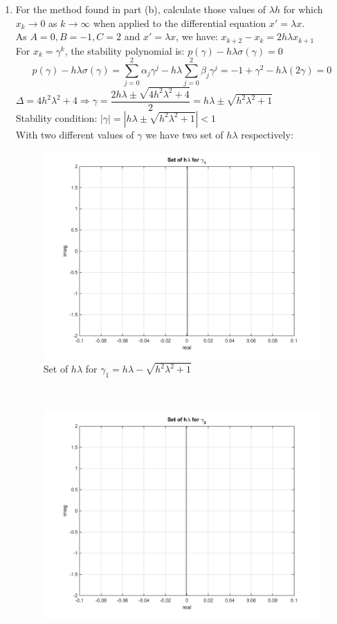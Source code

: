\documentclass[14pt,a4paper]{article}
\begin{document}
\begin{enumerate}
	\label{2e} 
	\item For the method found in part (b), calculate those values of $\lambda h$ for which $x_k \rightarrow 0$ as $k \rightarrow \infty$ when applied to the differential equation $x' = \lambda x$.\\
	As $A = 0, B = -1, C= 2$ and $x' = \lambda x$, we have: $x_{k+2} - x_k = 2h\lambda x_{k+1}$\\
	For $x_k = \gamma^k$, the stability polynomial is: $p(\gamma) - h\lambda\sigma(\gamma) = 0$
	$$p(\gamma) - h\lambda\sigma(\gamma) = \sum_{j=0}^{2}\alpha_j\gamma^j - h\lambda\sum_{j=0}^{2}\beta_j\gamma^j = -1 + \gamma^2 - h\lambda(2\gamma) = 0$$
	$\Delta = 4h^2\lambda^2 + 4 \Rightarrow \gamma = \dfrac{2h\lambda \pm \sqrt{4h^2\lambda^2 + 4}}{2} = h\lambda \pm \sqrt{h^2\lambda^2 +1}$\\
	Stability condition: $|\gamma| = |h\lambda \pm \sqrt{h^2\lambda^2 +1}| <1$\\
	With two different values of $\gamma$ we have two set of $h\lambda$ respectively: 
	\begin{figure}[htp]
		\centering
		\includegraphics[scale=0.5]{hw6_2e1.png}
		\caption{Set of $h\lambda$ for $\gamma_1 = h\lambda - \sqrt{h^2\lambda^2 +1}$}
	\end{figure}\\
	\begin{figure}[htp]
		\centering
		\includegraphics[scale=0.5]{hw6_2e2.png}

\end{figure}
\end{enumerate}
\end{document}
